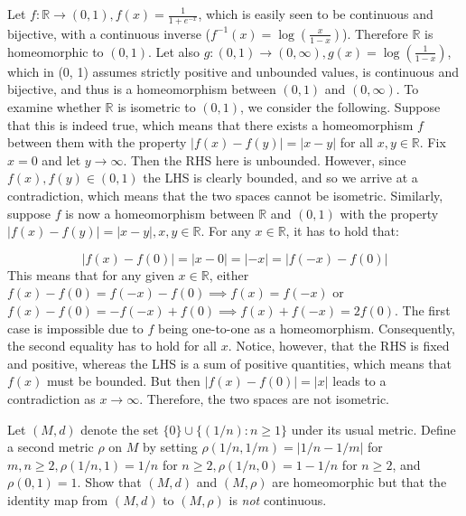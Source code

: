\begin{solution}
    
    Let $f: \mathbb{R} \rightarrow (0, 1), f(x) = \frac{1}{1 + e^{-x}}$, which is easily seen to be continuous and bijective, with a continuous inverse ($f^{-1}(x) = \log(\frac{x}{1 - x})$).
    Therefore $\mathbb{R}$ is homeomorphic to $(0, 1)$.
    Let also $g: (0, 1) \rightarrow (0, \infty), g(x) = \log(\frac{1}{1- x})$, which in (0, 1) assumes strictly positive and unbounded values, is continuous and bijective, and thus is a homeomorphism between $(0, 1)$ and $(0, \infty)$.
    To examine whether $\mathbb{R}$ is isometric to $(0, 1)$, we consider the following.
    Suppose that this is indeed true, which means that there exists a homeomorphism $f$ between them with the property $\lvert f(x) - f(y) \rvert = \lvert x - y \rvert$ for all $x, y \in \mathbb{R}$.
    Fix $x = 0$ and let $y \rightarrow \infty$.
    Then the RHS here is unbounded.
    However, since $f(x), f(y) \in (0, 1)$ the LHS is clearly bounded, and so we arrive at a contradiction, which means that the two spaces cannot be isometric.
    Similarly, suppose $f$ is now a homeomorphism between $\mathbb{R}$ and $(0, 1)$ with the property $\lvert f(x) - f(y) \rvert = \lvert x - y \rvert, x, y \in \mathbb{R}$.
    For any $x \in \mathbb{R}$, it has to hold that:

    \[\lvert f(x) - f(0) \rvert = \lvert x - 0 \rvert = \lvert -x \rvert = \lvert f(-x) - f(0) \rvert\]
    This means that for any given $x \in \mathbb{R}$, either $f(x) - f(0) = f(-x) - f(0) \implies f(x) = f(-x)$ or $f(x) - f(0) = -f(-x) + f(0) \implies f(x) + f(-x) = 2f(0)$.
    The first case is impossible due to $f$ being one-to-one as a homeomorphism.
    Consequently, the second equality has to hold for all $x$.
    Notice, however, that the RHS is fixed and positive, whereas the LHS is a sum of positive quantities, which means that $f(x)$ must be bounded.
    But then $\lvert f(x) - f(0) \rvert = \lvert x \rvert$ leads to a contradiction as $x \rightarrow \infty$.
    Therefore, the two spaces are not isometric.
\end{solution}

\begin{exercise}{50}
    Let $(M, d)$ denote the set $\{0\} \cup \{(1/n): n \geq 1\}$ under its usual metric.
    Define a second metric $\rho$ on $M$ by setting $\rho(1/n, 1/m) = \lvert 1/n - 1/m \rvert$ for $m, n \geq 2, \rho(1/n, 1) = 1/n$ for $n \geq 2, \rho(1/n, 0) = 1 - 1/n$ for $n \geq 2$, and $\rho(0, 1) = 1$.
    Show that $(M, d)$ and $(M, \rho)$ are homeomorphic but that the identity map from $(M, d)$ to $(M, \rho)$ is \textit{not} continuous.
\end{exercise}

